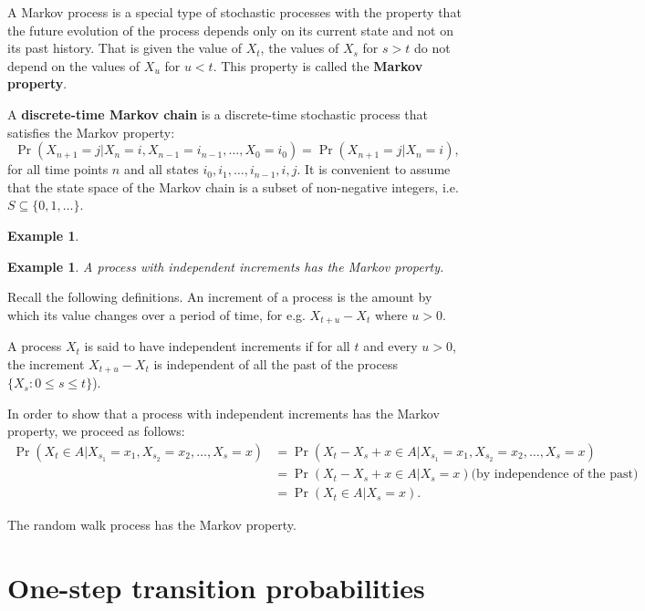 \documentclass[
]{book}
\theoremstyle{definition}
\theoremstyle{definition}
\newtheorem{example}{Example}[chapter]
\theoremstyle{definition}
\theoremstyle{definition}
\theoremstyle{remark}
\begin{document}
A Markov process is a special type of stochastic processes with the
property that the future evolution of the process depends only on its
current state and not on its past history. That is given the value of
\(X_t\), the values of \(X_s\) for \(s > t\) do not depend on the values of
\(X_u\) for \(u < t\). This property is called the \textbf{Markov property}.

A \textbf{discrete-time Markov chain} is a discrete-time stochastic process
that satisfies the Markov property:
\[\Pr(X_{n+1} = j | X_n = i, X_{n-1} = i_{n-1}, \ldots, X_0 = i_{0}) = \Pr(X_{n+1} = j | X_n = i),\]
for all time points \(n\) and all states \(i_0, i_1, \ldots, i_{n-1},i,j\).
It is convenient to assume that the state space of the Markov chain is a
subset of non-negative integers, i.e.~\(S \subseteq \{0, 1, \ldots \}\).

\begin{example}
\protect\hypertarget{exm:unlabeled-div-14}{}\label{exm:unlabeled-div-14}

\textbf{Example 1}. \emph{A process with independent increments has the Markov
property.}

\end{example}

Recall the following definitions. An increment of a process is the
amount by which its value changes over a period of time, for e.g.
\(X_{t +u} - X_t\) where \(u > 0\).

A process \(X_t\) is said to have independent increments if for all \(t\)
and every \(u > 0\), the increment \(X_{t +u} - X_t\) is independent of all
the past of the process \(\{X_s : 0 \le s \le t \}\)).

In order to show that a process with independent increments has the
Markov property, we proceed as follows: \[\begin{aligned}
\Pr(X_t \in A | X_{s_1} = x_1, X_{s_2} = x_2, \ldots, X_{s} = x)
&= \Pr(X_t - X_s + x \in A | X_{s_1} = x_1, X_{s_2} = x_2, \ldots, X_{s} = x) \\
&= \Pr(X_t - X_s + x \in A |  X_{s} = x)  \text{(by independence of the past)} \\
&= \Pr(X_t  \in A |  X_{s} = x).\end{aligned}\]

The random walk process has the Markov property.

\hypertarget{one-step-transition-probabilities}{%
\section{One-step transition probabilities}\label{one-step-transition-probabilities}}
\end{document}
